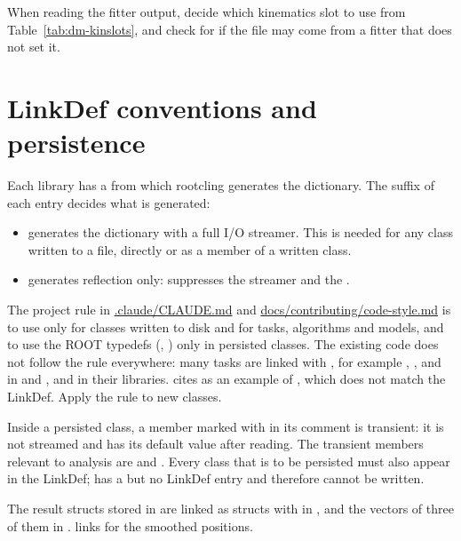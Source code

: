 When reading the fitter output, decide which kinematics slot to use from
Table~\ref{tab:dm-kinslots}, and check  for  if the file may come
from a fitter that does not set it.

\section{LinkDef conventions and persistence}
\label{sec:dm-linkdef}

Each library has a  from which rootcling generates the dictionary. The suffix of each
entry decides what is generated:
\begin{itemize}
\item {} generates the dictionary with a full I/O streamer. This is
  needed for any class written to a file, directly or as a member of a written class.
\item {} generates reflection only: \code{-} suppresses the streamer
  and \code{!} the .
\end{itemize}
The project rule in \url{.claude/CLAUDE.md} and \url{docs/contributing/code-style.md} is to use
\code{+} only for classes written to disk and \code{-!} for tasks, algorithms and models, and to use the
ROOT typedefs (, ) only in persisted classes. The existing code does not
follow the rule everywhere: many tasks are linked with \code{+}, for example ,
,  and  in  and
,  and  in their libraries. 
cites  as an example of \code{-!}, which does not match the LinkDef. Apply the rule
to new classes.

Inside a persisted class, a member marked with \code{//!} in its comment is transient: it is not
streamed and has its default value after reading. The transient members relevant to analysis are
 and . Every class that is to be
persisted must also appear in the LinkDef;  has a  but no LinkDef
entry and therefore cannot be written.

The result structs stored in  are linked as structs with \code{+} in
, and the vectors of three of them in
.  links  for the
smoothed positions.

